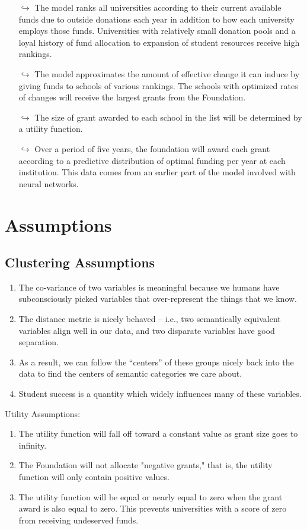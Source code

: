\documentclass[paper.tex]{subfiles}
\begin{document}
	\begin{itemize} 
		\item[$\hookrightarrow$] The model ranks all universities according to their current available funds due to outside donations each year in addition to how each university employs those funds. Universities with relatively small donation pools and a loyal history of fund allocation to expansion of student resources receive high rankings.
		\item[$\hookrightarrow$] The model approximates the amount of effective change it can induce by giving funds to schools of various rankings. The schools with optimized rates of changes will receive the largest grants from the Foundation.
		\item[$\hookrightarrow$] The size of grant awarded to each school in the list will be determined by a utility function.
		\item[$\hookrightarrow$] Over a period of five years, the foundation will award each grant according to a predictive distribution of optimal funding per year at each institution. This data comes from an earlier part of the model involved with neural networks.
	\end{itemize}
	
	\newpage
	\section{Assumptions}
	\subsection{Clustering Assumptions}
	\begin{enumerate}[itemsep=-0.5em]
		\item The co-variance of two variables is meaningful because we humans have subconsciously picked variables that over-represent the things that we know.
		\item The distance metric is nicely behaved -- i.e., two semantically equivalent variables align well in our data, and two disparate variables have good separation.
		\item As a result, we can follow the ``centers'' of these groups nicely back into the data to find the centers of semantic categories we care about.
		\item Student success is a quantity which widely influences many of these variables.
	\end{enumerate} 
		
	
Utility Assumptions:
	\begin{enumerate}
		\item The utility function will fall off toward a constant value as grant size goes to infinity.
		\item The Foundation will not allocate "negative grants," that is, the utility function will only contain positive values.
		\item The utility function will be equal or nearly equal to zero when the grant award is also equal to zero. This prevents universities with a score of zero from receiving undeserved funds.
	\end{enumerate}
\end{document}
